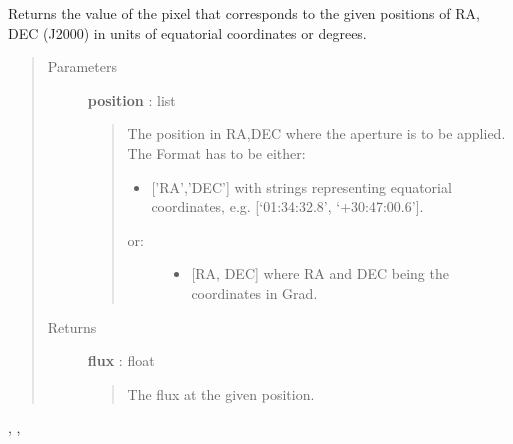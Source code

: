 \documentclass[a4paper,10pt,english]{sphinxmanual}
\begin{document}
\begin{fulllineitems}
\begin{fulllineitems}
\end{fulllineitems}


\begin{fulllineitems}
\label{maps:astrolyze.maps.fits.FitsMap.read_flux}
Returns the value of the pixel that corresponds to the
given positions of RA, DEC (J2000) in units of equatorial
coordinates or degrees.
\begin{quote}\begin{description}
\item[{Parameters }] \leavevmode
\textbf{position} : list
\begin{quote}

The position in RA,DEC where the aperture is to be applied.
The Format has to be either:
\begin{itemize}
\item {} 
{[}'RA','DEC'{]} with strings representing equatorial
coordinates, e.g. {[}`01:34:32.8', `+30:47:00.6'{]}.

\end{itemize}
\begin{description}
\item[{or:}] \leavevmode\begin{itemize}
\item {} 
{[}RA, DEC{]} where RA and DEC being the coordinates in Grad.

\end{itemize}

\end{description}
\end{quote}

\item[{Returns }] \leavevmode
\textbf{flux} : float
\begin{quote}

The flux at the given position.
\end{quote}

\end{description}\end{quote}




, , 



\end{fulllineitems}



\end{fulllineitems}
\end{document}
